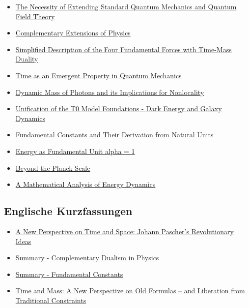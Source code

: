 \documentclass[a4paper,12pt]{article}
\newcommand{\repobase}{https://github.com/jpascher/T0-Time-Mass-Duality/tree/main/2/}
\begin{document}
	\begin{itemize}
		\item \href{\repobase/pdf/English/The Necessity of Extending Standard Quantum Mechanics and Quantum Field Theory.pdf}{The Necessity of Extending Standard Quantum Mechanics and Quantum Field Theory}
		\item \href{\repobase/pdf/English/complementary-extensions.pdf}{Complementary Extensions of Physics}
		\item \href{\repobase/pdf/English/Simplified Description of the Four Fundamental Forces with Time-Mass Duality.pdf}{Simplified Description of the Four Fundamental Forces with Time-Mass Duality}
		\item \href{\repobase/pdf/English/Time as an Emergent Property in Quantum Mechanics.pdf}{Time as an Emergent Property in Quantum Mechanics}
		\item \href{\repobase/pdf/English/Dynamic Mass of Photons and its Implications for Nonlocality.pdf}{Dynamic Mass of Photons and its Implications for Nonlocality}
		\item \href{\repobase/pdf/English/Unification of the T0 Model Foundations - Dark Energy and Galaxy Dynamics.pdf}{Unification of the T0 Model Foundations - Dark Energy and Galaxy Dynamics}
		\item \href{\repobase/pdf/English/fundamental-constants-derivation.pdf}{Fundamental Constants and Their Derivation from Natural Units}
		\item \href{\repobase/pdf/English/Energy as Fundamental Unit alpha = 1.pdf}{Energy as Fundamental Unit alpha = 1}
		\item \href{\repobase/pdf/English/Beyond the Planck Scale.pdf}{Beyond the Planck Scale}
		\item \href{\repobase/pdf/English/A Mathematical Analysis of Energy Dynamics.pdf}{A Mathematical Analysis of Energy Dynamics}
	\end{itemize}
	
	\subsection{Englische Kurzfassungen}
	
	\begin{itemize}
		\item \href{\repobase/pdf/English/A New Perspective on Time and Space Johann Pascher's Revolutionary Ideas.pdf}{A New Perspective on Time and Space: Johann Pascher's Revolutionary Ideas}
		\item \href{\repobase/pdf/English/Summary - Complementary Dualism in Physics.pdf}{Summary - Complementary Dualism in Physics}
		\item \href{\repobase/pdf/English/summary-fundamental-constants.pdf}{Summary - Fundamental Constants}
		\item \href{\repobase/pdf/English/Time and Mass A New Perspective on Old Formulas – and Liberation from Traditional Constraints.pdf}{Time and Mass: A New Perspective on Old Formulas – and Liberation from Traditional Constraints}
	\end{itemize}
	
\end{document}
